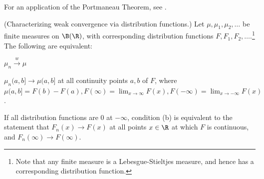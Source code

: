 \documentclass{article} %
\newcommand{\weakConvergence}{\stackrel{w}{\to}}
\begin{document}
\begin{example-for-data-scientists}
For an application of the Portmaneau Theorem, see \cite{cheng2020matched}.
\end{example-for-data-scientists}


\begin{theorem}\textnormal{(Characterizing weak convergence via distribution functions.)} Let $\mu, \mu_1, \mu_2, \hdots$ be finite measures on $\B(\R)$, with corresponding distribution functions $F, F_1, F_2, \hdots$.\footnote{Note that any finite measure is a Lebesgue-Stieltjes measure, and hence has a corresponding distribution function.} The following are equivalent:

\begin{alphabate}
\item $\mu_n \weakConvergence \mu$
\item $\mu_n(a,b] \to \mu(a,b]$ at all continuity points $a,b$ of $F$, where $\mu(a,b] = F(b) - F(a), F(\infty) = \lim_{x \to \infty} F(x), F(-\infty) = \lim_{x \to -\infty} F(x)$.

If all distribution functions are 0 at $-\infty$, condition (b) is equivalent to the statement that $F_n(x) \to F(x)$ at all points $x \in \R$ at which $F$ is continuous, and $F_n(\infty) \to F(\infty)$.
\end{alphabate}
\label{thm:weak_convergence_as_convergence_of_distribution_function_at_points_of_continuity}	
\end{theorem}
\end{document}
